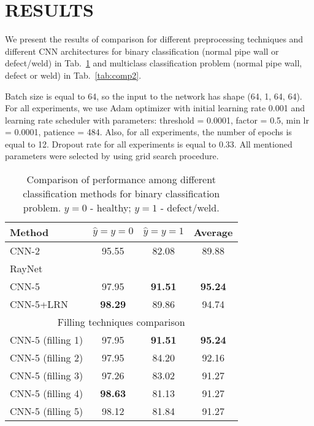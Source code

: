 \section{RESULTS}
\label{RESULTS}

We present the results of comparison for different preprocessing techniques and different CNN architectures for binary classification (normal pipe wall or defect/weld) in Tab.~\ref{tab:comp1} and multiclass classification problem (normal pipe wall, defect or weld) in Tab.~\ref{tab:comp2}.

Batch size is equal to 64, so the input to the network has shape (64, 1, 64, 64).
For all experiments, we use Adam optimizer with initial learning rate 0.001 and learning rate scheduler with parameters: threshold = 0.0001, factor = 0.5, min lr = 0.0001, patience = 484.
Also, for all experiments, the number of epochs is equal to 12.
Dropout rate for all experiments is equal to 0.33.
All mentioned parameters were selected by using grid search procedure.

\begin{table}[!htb]
	\caption{\label{tab:comp1}Comparison of performance among different classification methods for binary classification problem. $y=0$ - healthy; $y=1$ - defect/weld.}
	\begin{center}
		\small
		\begin{tabular}{| l | c | c | c |}
			\hline
			Method & $\hat{y}=y=0$ & $\hat{y}=y=1$ & Average \\
			\hline
			CNN-2 & 95.55 & 82.08 & 89.88 \\
			RayNet &  &  &  \\
			CNN-5 & 97.95 & \textbf{91.51} & \textbf{95.24} \\
			CNN-5+LRN & \textbf{98.29} & 89.86 & 94.74 \\
			\hline
			\multicolumn{4}{|c|}{Filling techniques comparison}  \\
			\hline
			CNN-5 (filling 1) & 97.95 & \textbf{91.51} & \textbf{95.24} \\
			CNN-5 (filling 2) & 97.95 & 84.20 & 92.16 \\
			CNN-5 (filling 3) & 97.26 & 83.02 & 91.27 \\
			CNN-5 (filling 4) & \textbf{98.63} & 81.13 & 91.27 \\
			CNN-5 (filling 5) & 98.12 & 81.84 & 91.27 \\
			\hline
		\end{tabular}
	\end{center}
\end{table}

